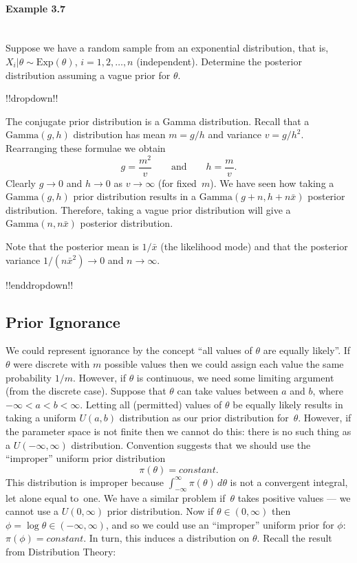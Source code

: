 \paragraph{Example 3.7}{~\\
Suppose we have a random sample from an exponential distribution, that is, $X_i|\theta\sim \mathrm{Exp}(\theta)$, $i=1,2,\ldots,n$ (independent). Determine the posterior distribution assuming a vague
prior for $\theta$.

!!dropdown!!

The conjugate prior distribution is a Gamma distribution. Recall that a $\mathrm{Gamma}(g,h)$ distribution has mean $m=g/h$ and variance $v=g/h^2$. Rearranging these formulae we obtain
        \begin{equation*}
        g=\frac{m^2}{v}\quad\quad\text{and}\quad\quad h=\frac{m}{v}. 
        \end{equation*}
        Clearly $g\to 0$ and $h\to 0$ as $v\to\infty$ (for fixed~$m$).  We have seen how taking a $\mathrm{Gamma}(g,h)$ prior distribution results in a $\mathrm{Gamma}(g+n,h+n\bar x)$ posterior distribution. Therefore, taking a vague prior distribution will give a $\mathrm{Gamma}(n,n\bar x)$ posterior distribution. 
        
        Note that the posterior mean is $1/\bar x$ (the likelihood mode) and that the posterior variance $1/(n\bar x^2)\to 0$ and $n\to\infty$.

!!enddropdown!!}

\clearpage

\subsection*{Prior Ignorance}
We could represent ignorance by the concept ``all values of $\theta$ are equally likely''. If $\theta$ were discrete with $m$ possible values then we could assign each value the same probability $1/m$. However, if $\theta$ is continuous, we need some limiting argument (from the discrete case). Suppose that $\theta$ can take values between $a$ and $b$, where $-\infty<a<b<\infty$. Letting all (permitted) values of $\theta$ be equally likely results in taking a uniform $U(a,b)$ distribution as our prior distribution for~$\theta$. However, if the parameter space is not finite then we cannot do this: there is no such thing as a $U(-\infty,\infty)$ distribution. Convention suggests that we should use the ``improper'' uniform prior distribution
\begin{equation*}
\pi(\theta)=constant.
\end{equation*}
This distribution is improper because $\int_{-\infty}^\infty \pi(\theta)\,d\theta$ is not a convergent integral, let alone equal to~one. We have a similar problem if~$\theta$  takes positive values --- we cannot use a $U(0,\infty)$ prior distribution. Now if $\theta\in (0,\infty)$ then $\phi=\log\theta\in (-\infty,\infty)$, and so we could use an ``improper'' uniform prior for $\phi$: $\pi(\phi)=constant$. In turn, this induces a distribution on $\theta$. Recall the result from Distribution Theory:

